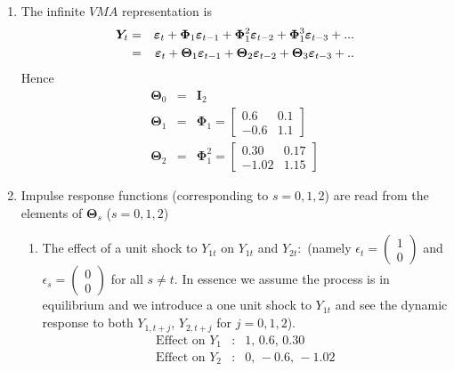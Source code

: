 \documentclass[oneside,openany]{tufte-book} %
\begin{document}
\begin{enumerate}
\begin{enumerate}
	\item The infinite $VMA$ representation is
	\begin{eqnarray*}
		\bm{Y}_{t} &=&\bm{\varepsilon }_{t}+\bm{\Phi }_{1}\bm{%
			\varepsilon }_{t-1}+\bm{\Phi }_{1}^{2}\bm{\varepsilon }_{t-2}+%
		\bm{\Phi }_{1}^{3}\bm{\varepsilon }_{t-3}+... \\
		&=&\bm{\varepsilon }_{t}+\bm{\Theta }_{1}\bm{\varepsilon }_{t-1}+%
		\bm{\Theta }_{2}\bm{\varepsilon }_{t-2}+\bm{\Theta }_{3}\bm{%
			\varepsilon }_{t-3}+..
	\end{eqnarray*}%
	Hence%
	\begin{eqnarray*}
		\bm{\Theta }_{0} &=&\bm{I}_{2} \\
		\bm{\Theta }_{1} &=&\bm{\Phi }_{1}\bm{=}\left[
		\begin{array}{cc}
			0.6 & 0.1 \\
			-0.6 & 1.1%
		\end{array}%
		\right]  \\
		\bm{\Theta }_{2} &=&\bm{\Phi }_{1}^{2}=\left[
		\begin{array}{cc}
			0.30 & 0.17 \\
			-1.02 & 1.15%
		\end{array}%
		\right]
	\end{eqnarray*}%
	\medskip
	
	\item Impulse response functions (corresponding to $s=0,1,2$) are read from
	the elements of $\bm{\Theta }_{s}$ ($s=0,1,2$)
	
	\begin{enumerate}
		\item The effect of a unit shock to $Y_{1t}$ on $Y_{1t}$ and $Y_{2t}:$ (namely $\epsilon_t=\left(\begin{array}{c} 1 \\ 0 \end{array}\right)$ and $\epsilon_s= \left(\begin{array}{c} 0 \\ 0 \end{array}\right)$ for all $s\neq t$. In essence  we assume the process is in equilibrium and we introduce a one unit shock to $Y_{1t}$ and see the dynamic response to both $Y_{1,t+j}$, $Y_{2,t+j}$ for $j=0,1,2$).
		\begin{eqnarray*}
			\text{Effect on }Y_{1} &:&1\text{, }0.6\text{, }0.30 \\
			\text{Effect on }Y_{2} &:&0\text{, }-0.6\text{, }-1.02
		\end{eqnarray*}
		

\end{enumerate}
\end{enumerate}
\end{enumerate}
\end{document}
